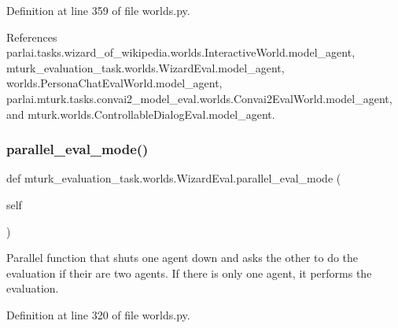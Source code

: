 Definition at line 359 of file worlds.\+py.



References parlai.\+tasks.\+wizard\+\_\+of\+\_\+wikipedia.\+worlds.\+Interactive\+World.\+model\+\_\+agent, mturk\+\_\+evaluation\+\_\+task.\+worlds.\+Wizard\+Eval.\+model\+\_\+agent, worlds.\+Persona\+Chat\+Eval\+World.\+model\+\_\+agent, parlai.\+mturk.\+tasks.\+convai2\+\_\+model\+\_\+eval.\+worlds.\+Convai2\+Eval\+World.\+model\+\_\+agent, and mturk.\+worlds.\+Controllable\+Dialog\+Eval.\+model\+\_\+agent.

\mbox{\label{classmturk__evaluation__task_1_1worlds_1_1WizardEval_a63d88c9aa26eb8886eb2928d920017cb}} 
\subsubsection{\texorpdfstring{parallel\+\_\+eval\+\_\+mode()}{parallel\_eval\_mode()}}
{\footnotesize\ttfamily def mturk\+\_\+evaluation\+\_\+task.\+worlds.\+Wizard\+Eval.\+parallel\+\_\+eval\+\_\+mode (\begin{DoxyParamCaption}\item[{}]{self }\end{DoxyParamCaption})}

\begin{DoxyVerb}Parallel function that shuts one agent down and asks the other
to do the evaluation if their are two agents. If there is only
one agent, it performs the evaluation.
\end{DoxyVerb}
 

Definition at line 320 of file worlds.\+py.



